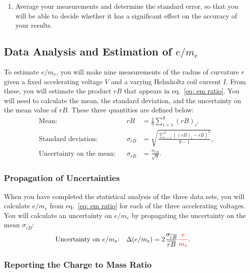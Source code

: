 \documentclass[addpoints]{physlabs}
\begin{document}
\begin{labsection}
\begin{experiment}
\begin{enumerate}
        \item Average your measurements and determine the standard error, so that you will be able to decide whether it has a significant effect on the accuracy of your results.
    \end{enumerate}

    \subsection*{Data Analysis and Estimation of $e/m_e$}

    To estimate $e/m_e$, you will make nine measurements of the radius of curvature $r$ given a fixed accelerating voltage $V$ and a varying Helmholtz coil current $I$. From these, you will estimate the product $rB$ that appears in eq.~\ref{eq: em ratio}. You will need to calculate the mean, the standard deviation, and the uncertainty on the mean value of $rB$. These three quantities are defined below:
    \begin{align}
        \text{Mean:}& & \overline{rB} &= \frac{1}{9}\sum_{i=1}^9 (rB)_i, \label{eq: rB mean}
        \\
        \text{Standard deviation:}& & \sigma_{rB}&= \sqrt{\frac{\sum_{i=1}^9\left((rB)_i - \overline{rB}\right)^2}{9-1}}, \label{eq: rB std dev}
        \\
        \text{Uncertainty on the mean:}& & \sigma_{\overline{rB}} &= \frac{\sigma_{rB}}{\sqrt{9}}.
    \end{align}

    \subsubsection*{Propagation of Uncertainties}

    When you have completed the statistical analysis of the three data sets, you will calculate $e/m_e$ from eq.~\ref{eq: em ratio} for each of the three accelerating voltages. You will calculate an uncertainty on $e/m_e$ by propagating the uncertainty on the mean $\sigma_{\overline{rB}}$:
    \begin{align}
        \text{Uncertainty on $e/m_e$:}& & \Delta(e/m_e) &= 2\frac{\sigma_{\overline{rB}}}{\overline{rB}}{\color{red}\frac{e}{m_e}}.
    \end{align}

    \subsubsection*{Reporting the Charge to Mass Ratio}


\end{experiment}
\end{labsection}
\end{document}
